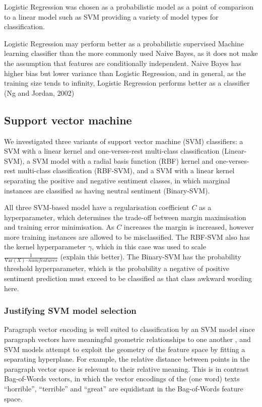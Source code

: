 \documentclass[11pt]{article}
\newcommand{\drafting}[1]{\textcolor{OliveGreen}{#1}}
\begin{document}
\drafting{
Logistic Regression was chosen as a probabilistic model as a point of comparison to a linear model such as SVM providing a variety of model types for classification.
}

\drafting{
Logistic Regression may perform better as a probabilistic supervised Machine learning classifier than the more commonly used Naive Bayes, as it does not make the assumption that features are conditionally independent. Naive Bayes has higher bias but lower variance than Logistic Regression, and in general, as the training size tends to infinity, Logistic Regression performs better as a classifier (Ng and Jordan, 2002)
}

\subsection{Support vector machine} \label{subsec:method-svm}
We investigated three variants of support vector machine (SVM) classifiers: a SVM with a linear kernel and one-verses-rest multi-class classification (Linear-SVM), a SVM model with a radial basis function (RBF) kernel and one-verses-rest multi-class classification (RBF-SVM), and a SVM with a linear kernel separating the positive and negative sentiment classes, in which marginal instances are classified as having neutral sentiment (Binary-SVM). 

All three SVM-based model have a regularisation coefficient $C$ as a hyperparameter, which determines the trade-off between margin maximisation and training error minimisation. As $C$ increases the margin is increased, however more training instances are allowed to be misclassified. The RBF-SVM also has the kernel hyperparameter $\gamma$, which in this case was used to scale $\frac{1}{\textrm{Var}(X) \cdot numfeatures}$ (\drafting{explain this better}). The Binary-SVM has the probability threshold hyperparameter, which is the probability a negative of positive sentiment prediction must exceed to be classified as that class \drafting{awkward wording here}.

\subsubsection*{Justifying SVM model selection}
Paragraph vector encoding is well suited to classification by an SVM model since paragraph vectors have meaningful geometric relationships to one another \cite{le_distributed_2014}, and SVM models attempt to exploit the geometry of the feature space by fitting a separating hyperplane. For example, the relative distance between points in the paragraph vector space is relevant to their relative meaning. This is in contrast Bag-of-Words vectors, in which the vector encodings of the (one word) texts ``horrible'', ``terrible'' and ``great'' are equidistant in the Bag-of-Words feature space.
\end{document}

